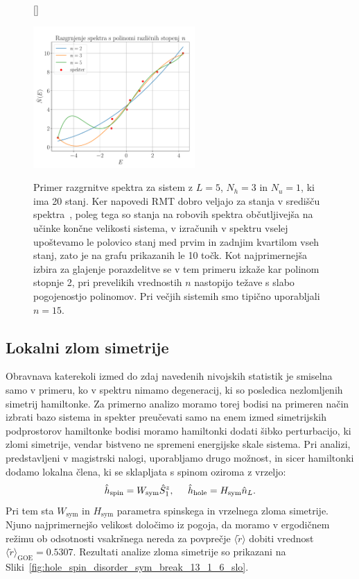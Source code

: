 \begin{figure}[H]
[\FBwidth]
{\caption{Primer razgrnitve spektra za sistem z $L=5$, $N_h=3$ in $N_u=1$, ki ima 20 stanj. Ker napovedi RMT dobro veljajo za stanja v središču spektra~\cite{d2016quantum}, poleg tega so stanja na robovih spektra občutljivejša na učinke končne velikosti sistema, v izračunih v spektru vselej upoštevamo le polovico stanj med prvim in zadnjim kvartilom vseh stanj, zato je na grafu prikazanih le 10 točk. Kot najprimernejša izbira za glajenje porazdelitve se v tem primeru izkaže kar polinom stopnje 2, pri prevelikih vrednostih $n$ nastopijo težave s slabo pogojenostjo polinomov. Pri večjih sistemih smo tipično uporabljali $n=15.$ }\label{fig:unfolding_schematics}}
{\includegraphics[width=0.55\textwidth]{unfolding_schematics.pdf}}
\end{figure}\newpage
\subsection{Lokalni zlom simetrije}
\label{lokalni_zlom_simetrije}
Obravnava katerekoli izmed do zdaj navedenih nivojskih statistik je smiselna samo v primeru, ko v spektru nimamo degeneracij, ki so posledica nezlomljenih simetrij hamiltonke. Za primerno analizo moramo torej bodisi na primeren način izbrati bazo sistema in spekter preučevati samo na enem izmed simetrijskih podprostorov hamiltonke bodisi moramo hamiltonki dodati šibko perturbacijo, ki zlomi simetrije, vendar bistveno ne spremeni energijske skale sistema. Pri analizi, predstavljeni v magistrski nalogi, uporabljamo drugo možnost, in sicer hamiltonki dodamo lokalna člena, ki se sklapljata s spinom oziroma z vrzeljo:
\begin{equation}\label{eq:sym_break_terms}
\hat{h}_\mathrm{spin}=W_\mathrm{sym}\hat{S}_1^z, \hspace{5mm} \hat{h}_\mathrm{hole}=H_\mathrm{sym}\hat{n}_L.
\end{equation}
Pri tem sta $W_\mathrm{sym}$ in $H_\mathrm{sym}$ parametra spinskega in vrzelnega zloma simetrije. Njuno najprimernejšo velikost določimo iz pogoja, da moramo v ergodičnem režimu ob odsotnosti vsakršnega nereda za povprečje $\langle\tilde{r} \rangle$ dobiti vrednost $\langle\tilde{r}\rangle_\mathrm{GOE}=0.5307$. Rezultati analize zloma simetrije so prikazani na Sliki~\ref{fig:hole_spin_disorder_sym_break_13_1_6_slo}.

